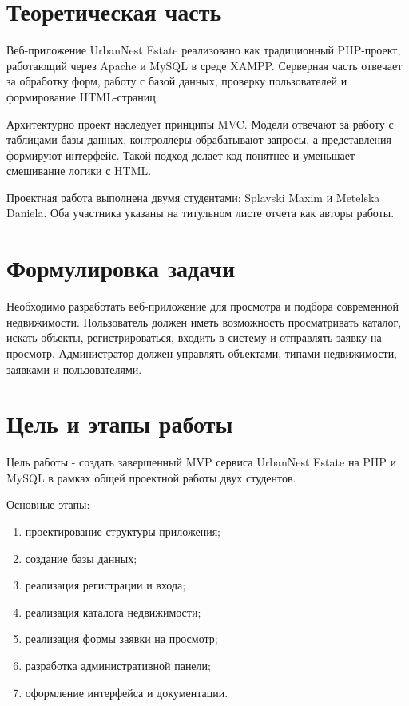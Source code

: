 \documentclass[12pt,a4paper]{article}
\begin{document}
\makeprojecttitle
\tableofcontents
\newpage

\section{Теоретическая часть}

Веб-приложение UrbanNest Estate реализовано как традиционный PHP-проект, работающий через Apache и MySQL в среде XAMPP. Серверная часть отвечает за обработку форм, работу с базой данных, проверку пользователей и формирование HTML-страниц.

Архитектурно проект наследует принципы MVC. Модели отвечают за работу с таблицами базы данных, контроллеры обрабатывают запросы, а представления формируют интерфейс. Такой подход делает код понятнее и уменьшает смешивание логики с HTML.

Проектная работа выполнена двумя студентами: Splavski Maxim и Metelska Daniela. Оба участника указаны на титульном листе отчета как авторы работы.

\section{Формулировка задачи}

Необходимо разработать веб-приложение для просмотра и подбора современной недвижимости. Пользователь должен иметь возможность просматривать каталог, искать объекты, регистрироваться, входить в систему и отправлять заявку на просмотр. Администратор должен управлять объектами, типами недвижимости, заявками и пользователями.

\section{Цель и этапы работы}

Цель работы - создать завершенный MVP сервиса UrbanNest Estate на PHP и MySQL в рамках общей проектной работы двух студентов.

Основные этапы:
\begin{enumerate}
  \item проектирование структуры приложения;
  \item создание базы данных;
  \item реализация регистрации и входа;
  \item реализация каталога недвижимости;
  \item реализация формы заявки на просмотр;
  \item разработка административной панели;
  \item оформление интерфейса и документации.
\end{enumerate}
\end{document}
